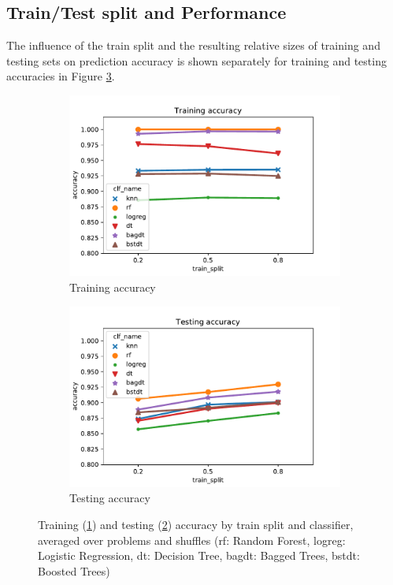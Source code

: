 \documentclass[twoside,11pt]{article}
\begin{document}
		\subsection{Train/Test split and Performance}
			The influence of the train split and the resulting relative sizes of training and testing sets on prediction accuracy is shown separately for training and testing accuracies in Figure \ref{fig:perf_by_trainsplit}.
			
			\begin{figure}[h]
				\begin{framed}
					\begin{subfigure}{.5\textwidth}
						\includegraphics[width=\textwidth]{tr_acc_by_clf_trainsplit}
						\caption{Training accuracy}
						\label{fig:perf_by_trainsplit_tr}
					\end{subfigure}
					\begin{subfigure}{.5\textwidth}
						\includegraphics[width=\textwidth]{te_acc_by_clf_trainsplit}
						\caption{Testing accuracy}
						\label{fig:perf_by_trainsplit_te}
					\end{subfigure}
					\caption{Training (\ref{fig:perf_by_trainsplit_tr}) and testing (\ref{fig:perf_by_trainsplit_te}) accuracy by train split and classifier, averaged over problems and shuffles (rf: Random Forest, logreg: Logistic Regression, dt: Decision Tree, bagdt: Bagged Trees, bstdt: Boosted Trees)}
					\label{fig:perf_by_trainsplit}
				\end{framed}
			\end{figure}
		
\end{document}
